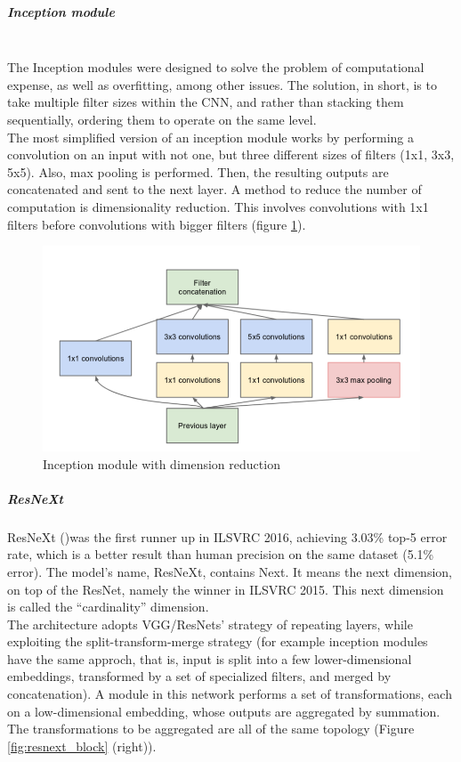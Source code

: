 \documentclass{article}
\begin{document}
\subparagraph{Inception module}\mbox{}\\
The Inception modules were designed to solve the problem of computational expense, as well as overfitting, among other issues. The solution, in short, is to take multiple filter sizes within the CNN, and rather than stacking them sequentially, ordering them to operate on the same level. \\
 The most simplified version of an inception module works by performing a convolution on an input with not one, but three different sizes of filters (1x1, 3x3, 5x5). Also, max pooling is performed. Then, the resulting outputs are concatenated and sent to the next layer.
A method to reduce the number of computation is dimensionality reduction. This involves convolutions with 1x1 filters before convolutions with bigger filters (figure \ref{fig:incmodule}).
\begin{figure}[h]
	\centering
	\includegraphics[width=0.7\linewidth]{image/inc_module}
	\caption{Inception module with dimension reduction}
	\label{fig:incmodule}
\end{figure}




\subparagraph{ResNeXt}
ResNeXt (\cite{resneXt})was the first runner up in ILSVRC 2016, achieving 3.03\% top-5 error rate, which is a better result than human precision on the same dataset (5.1\% error). The model's name, ResNeXt, contains Next. It means the next dimension, on top of the ResNet, namely the winner in ILSVRC 2015. This next dimension is called the “cardinality” dimension.\\
The architecture adopts VGG/ResNets' strategy of repeating layers, while
exploiting the split-transform-merge strategy (for example inception modules have the same approch, that is, input is split into a few lower-dimensional embeddings, transformed by a set of specialized filters, and merged by concatenation). 
A module in this network performs a set of transformations, each on a low-dimensional embedding, whose outputs are aggregated by summation. The transformations to be aggregated are all of the same topology (Figure \ref{fig:resnext_block} (right)).\\
\end{document}
